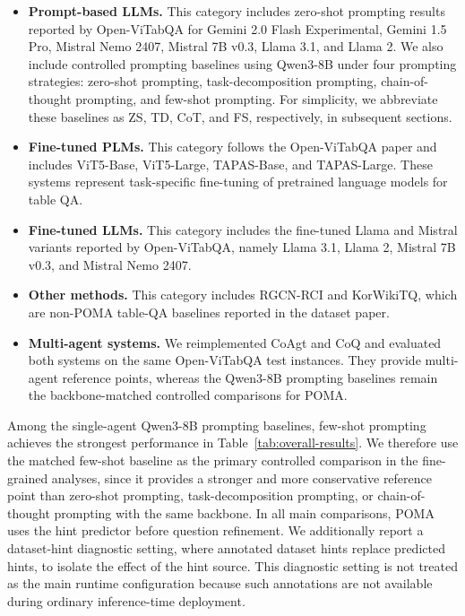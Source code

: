 \documentclass[]{interact}
\begin{document}
\begin{itemize}
\item \textbf{Prompt-based LLMs.} This category includes zero-shot prompting results reported by Open-ViTabQA for Gemini 2.0 Flash Experimental, Gemini 1.5 Pro, Mistral Nemo 2407, Mistral 7B v0.3, Llama 3.1, and Llama 2. We also include controlled prompting baselines using Qwen3-8B under four prompting strategies: zero-shot prompting, task-decomposition prompting, chain-of-thought prompting, and few-shot prompting. For simplicity, we abbreviate these baselines as ZS, TD, CoT, and FS, respectively, in subsequent sections.

\item \textbf{Fine-tuned PLMs.} This category follows the Open-ViTabQA paper and includes ViT5-Base, ViT5-Large, TAPAS-Base, and TAPAS-Large. These systems represent task-specific fine-tuning of pretrained language models for table QA.

\item \textbf{Fine-tuned LLMs.} This category includes the fine-tuned Llama and Mistral variants reported by Open-ViTabQA, namely Llama 3.1, Llama 2, Mistral 7B v0.3, and Mistral Nemo 2407.

\item \textbf{Other methods.} This category includes RGCN-RCI and KorWikiTQ, which are non-POMA table-QA baselines reported in the dataset paper.

\item \textbf{Multi-agent systems.} We reimplemented CoAgt \citep{alrayzah-alqhtani-2025-coagt} and CoQ \citep{sui-etal-2025-coq} and evaluated both systems on the same Open-ViTabQA test instances. They provide multi-agent reference points, whereas the Qwen3-8B prompting baselines remain the backbone-matched controlled comparisons for POMA.
\end{itemize}

Among the single-agent Qwen3-8B prompting baselines, few-shot prompting achieves the strongest performance in Table~\ref{tab:overall-results}. We therefore use the matched few-shot baseline as the primary controlled comparison in the fine-grained analyses, since it provides a stronger and more conservative reference point than zero-shot prompting, task-decomposition prompting, or chain-of-thought prompting with the same backbone. In all main comparisons, POMA uses the hint predictor before question refinement. We additionally report a dataset-hint diagnostic setting, where annotated dataset hints replace predicted hints, to isolate the effect of the hint source. This diagnostic setting is not treated as the main runtime configuration because such annotations are not available during ordinary inference-time deployment.
\end{document}
